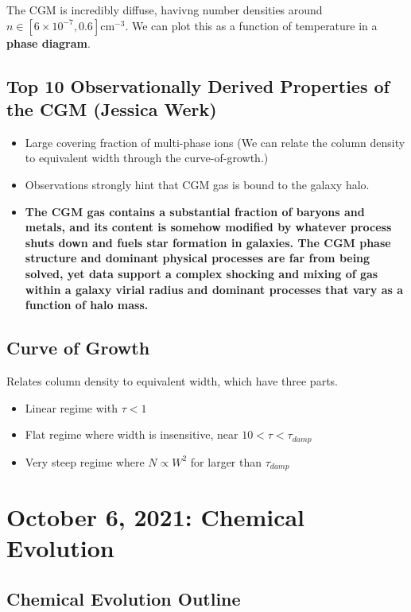 \documentclass{article}
\begin{document}
The CGM is incredibly diffuse, havivng number densities around $n \in [6\times 10^{-7}, 0.6] \text{cm}^{-3}$. We can plot this as a function of temperature in a  \textbf{phase diagram}.

\subsection{Top 10 Observationally Derived Properties of the CGM (Jessica Werk)}

\begin{itemize}
    \item Large covering fraction of multi-phase ions (We can relate the column density to equivalent width through the curve-of-growth.)
    \item Observations strongly hint that CGM gas is bound to the galaxy halo.
    \item \textbf{The CGM gas contains a substantial fraction of baryons and metals, and its content is somehow modified by whatever process shuts down and fuels star formation in galaxies. The CGM phase structure and dominant physical processes are far from being solved, yet data support a complex shocking and mixing of gas within a galaxy virial radius and dominant processes that vary as a function of halo mass. }
\end{itemize}

\subsection{Curve of Growth}

Relates column density to equivalent width, which have three parts. 

\begin{itemize}
    \item Linear regime with $\tau < 1$
    \item Flat regime where width is insensitive, near $10 < \tau < \tau_{damp}$
    \item Very steep regime where $N\propto W^2$ for larger than $\tau_{damp}$
\end{itemize}

\section{October 6, 2021: Chemical Evolution}

\subsection{Chemical Evolution Outline}
\end{document}
